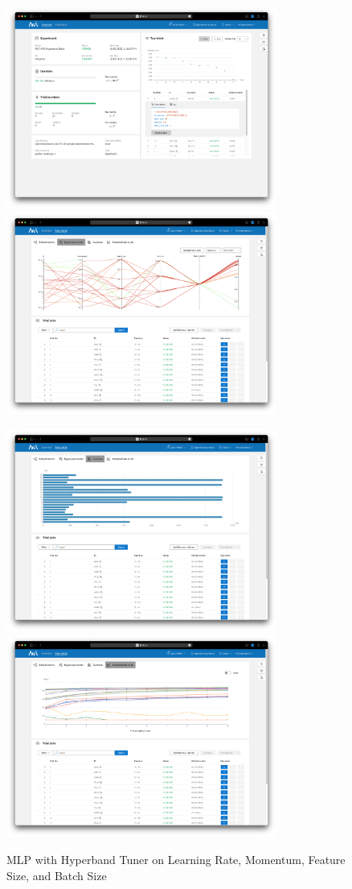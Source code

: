 \documentclass{article}
\begin{document}
\begin{figure}
	\centerline{\includegraphics[width=3.5in]{../proj3/figures/mlp_hyperband_batch_overview.png}\includegraphics[width=3.5in]{../proj3/figures/mlp_hyperband_batch_hyperparameter.png}}
	\centerline{\includegraphics[width=3.5in]{../proj3/figures/mlp_hyperband_batch_latency.png}\includegraphics[width=3.5in]{../proj3/figures/mlp_hyperband_batch_intermediate.png}}
	\caption{MLP with Hyperband Tuner on Learning Rate, Momentum, Feature Size, and Batch Size}
	\label{fig:mlp-hyperband-batch}
\end{figure}
\end{document}

